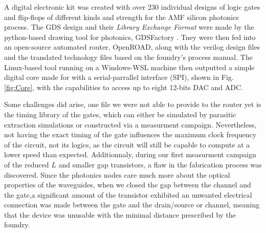 

A digital electronic kit was created with over 230 individual designs of logic gates and flip-flops of different kinds and strength for the AMF silicon photonics process\CitationNeeded.
The GDS design and their \textit{Library Exchange Format} were made by the python-based drawing tool for photonics, GDSFactory \CitationNeeded.
Tney were then fed into an open-source automated router, OpenROAD\CitationNeeded, along with the verilog design files and the translated technology files based on the foundry's process manual. 
The Linux-based tool running on a Windows-WSL machine then outputted a simple digital core made for with a serial-parrallel interface (SPI), shown in Fig. \ref{fig:Core}, with the capabilities to access up to eight 12-bits DAC and ADC.

Some challenges did arise, one file we were not able to provide to the router yet is the timing library of the gates, which can either be simulated by parasitic extraction simulations or constructed via a measurment campaign.  
Nevertheless, not having the exact timing of the gate influences the maximum clock frequency of the circuit, not its logics, as the circuit will still be capable to compute at a lower speed than expected. 
Additionnaly, during our first measurment campaign of the reduced $L$ and smaller gap transistors, a flaw in the fabrication process was discovered. 
Since the photonics nodes care much more about the optical properties of the waveguides, when we closed the gap between the channel and the gate,a significant amount of the transistor exhibited an unwanted electrical connection was made between the gate and the drain/source or channel, meaning that the device was unusable with the minimal distance prescribed by the foundry. 



